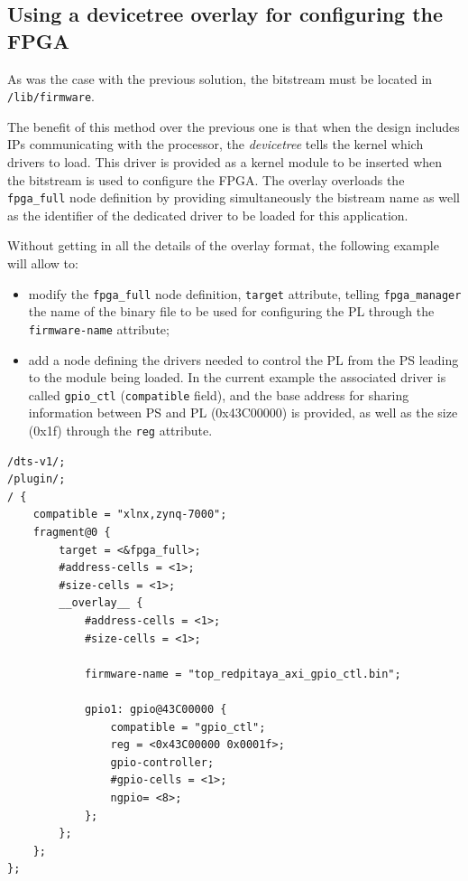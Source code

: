 \subsection{Using a devicetree overlay for configuring the FPGA}

As was the case with the previous solution, the bitstream must be located in
{\tt /lib/firmware}.

The benefit of this method over the previous one is that when the design includes IPs
communicating with the processor, the {\em devicetree} tells the kernel which drivers
to load. This driver is provided as a kernel module to be inserted when the bitstream
is used to configure the FPGA. The overlay overloads the {\tt fpga\_full} node definition 
by providing simultaneously the bistream name as well as the identifier of the dedicated
driver to be loaded for this application.

Without getting in all the details of the overlay format, the following example
will allow to:
\begin{itemize}
\item modify the {\tt fpga\_full} node definition, {\tt target} attribute, telling
{\tt fpga\_manager} the name of the binary file to be used for configuring the
PL through the {\tt firmware-name} attribute;
\item add a node defining the drivers needed to control the PL from the PS leading
to the module being loaded. In the current example the associated driver is
called {\tt gpio\_ctl} ({\tt compatible} field), and the base address for sharing
information between PS and PL (0x43C00000) is provided, as well as the size (0x1f) 
through the {\tt reg} attribute.
\end{itemize}\vspace{0.3cm}
 
\begin{lstlisting}
/dts-v1/;
/plugin/;
/ {
    compatible = "xlnx,zynq-7000";
    fragment@0 {
        target = <&fpga_full>;
        #address-cells = <1>;
        #size-cells = <1>;
        __overlay__ {
            #address-cells = <1>;
            #size-cells = <1>;

            firmware-name = "top_redpitaya_axi_gpio_ctl.bin";

            gpio1: gpio@43C00000 {
                compatible = "gpio_ctl";
                reg = <0x43C00000 0x0001f>;
                gpio-controller;
                #gpio-cells = <1>;
                ngpio= <8>;
            };
        };
    };
};

\end{lstlisting}

